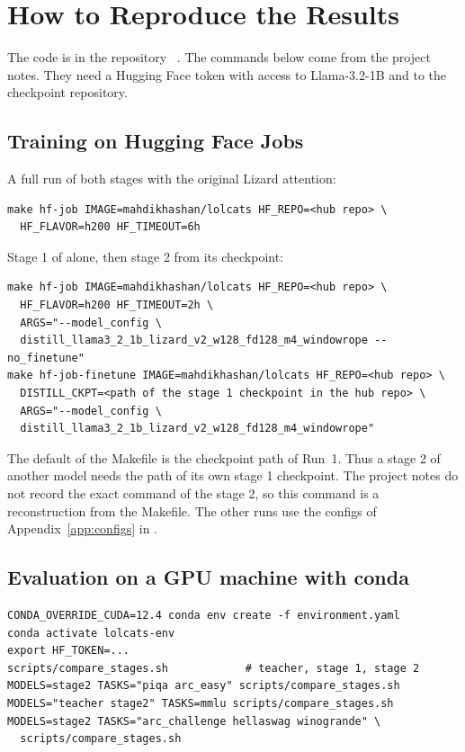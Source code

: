 \chapter{How to Reproduce the Results}
\label{app:reproduce}

The code is in the repository ~\cite{lolcatsrepo}. The commands below come from the project notes. They need a Hugging Face token with access to Llama-3.2-1B and to the checkpoint repository.

\section{Training on Hugging Face Jobs}

A full run of both stages with the original Lizard attention:
\begin{verbatim}
make hf-job IMAGE=mahdikhashan/lolcats HF_REPO=<hub repo> \
  HF_FLAVOR=h200 HF_TIMEOUT=6h
\end{verbatim}
Stage 1 of  alone, then stage 2 from its checkpoint:
\begin{verbatim}
make hf-job IMAGE=mahdikhashan/lolcats HF_REPO=<hub repo> \
  HF_FLAVOR=h200 HF_TIMEOUT=2h \
  ARGS="--model_config \
  distill_llama3_2_1b_lizard_v2_w128_fd128_m4_windowrope --no_finetune"
make hf-job-finetune IMAGE=mahdikhashan/lolcats HF_REPO=<hub repo> \
  DISTILL_CKPT=<path of the stage 1 checkpoint in the hub repo> \
  ARGS="--model_config \
  distill_llama3_2_1b_lizard_v2_w128_fd128_m4_windowrope"
\end{verbatim}
The default  of the Makefile is the checkpoint path of Run~1. Thus a stage 2 of another model needs the path of its own stage 1 checkpoint. The project notes do not record the exact command of the  stage 2, so this command is a reconstruction from the Makefile. The other runs use the configs of Appendix~\ref{app:configs} in .

\section{Evaluation on a GPU machine with conda}

\begin{verbatim}
CONDA_OVERRIDE_CUDA=12.4 conda env create -f environment.yaml
conda activate lolcats-env
export HF_TOKEN=...
scripts/compare_stages.sh            # teacher, stage 1, stage 2
MODELS=stage2 TASKS="piqa arc_easy" scripts/compare_stages.sh
MODELS="teacher stage2" TASKS=mmlu scripts/compare_stages.sh
MODELS=stage2 TASKS="arc_challenge hellaswag winogrande" \
  scripts/compare_stages.sh
\end{verbatim}

